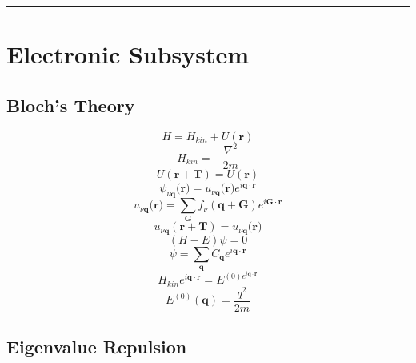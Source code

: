 \documentclass[12pt]{extarticle}
\newcommand{\parentheses}[1]{\ensuremath{\left( #1 \right)}}
\newcommand{\mysection}[1]{
\vspace{1mm}
\hrule
\section{\Huge{#1}}}
\begin{document}
\begin{multicols*}{2}
\mysection{Electronic Subsystem}
\subsection{Bloch's Theory}
$$H= H_{kin}+U(\mathbf{r})$$
$$H_{kin}= -\dfrac{\nabla^ 2}{2m}$$
$$U(\mathbf{r}+\mathbf{T})=U(\mathbf{r})$$
$$\psi_{\nu \mathbf{q}}(\mathbf{r)}= u_{\nu \mathbf{q}}(\mathbf{r)} e^{i \mathbf{q} \cdot \mathbf{r}}$$
$$u_{\nu \mathbf{q}}(\mathbf{r)} = \sum_{\mathbf{G}} f_\nu \parentheses{\mathbf{q}+\mathbf{G}} e^{i \mathbf{G} \cdot \mathbf{r}}$$
$$u_{\nu \mathbf{q}}(\mathbf{r}+\mathbf{T}) = u_{\nu \mathbf{q}}(\mathbf{r)}$$
$$(H-E)\psi=0$$
$$\psi=\sum_{\mathbf{q}}C_{\mathbf{q}}e^{i \mathbf{q}\cdot \mathbf{r}}$$
$$H_{kin} e^{i \mathbf{q}\cdot \mathbf{r}} = E^{(0)e^{i \mathbf{q}\cdot \mathbf{r}}}$$
$$E^{(0)}(\mathbf{q})=\dfrac{q^2}{2m}$$

\subsection{Eigenvalue Repulsion}

\end{multicols*}
\end{document}
